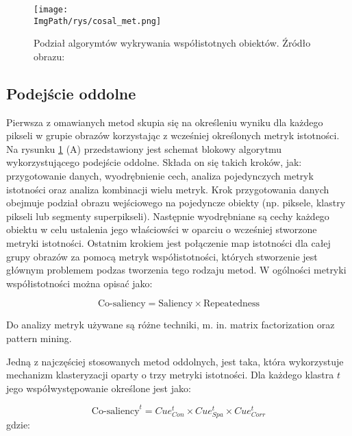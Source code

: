 \documentclass[a4paper,12pt,twoside,openany]{report}
\newcommand{\ImgPath}{.}
\begin{document}
	\begin{figure}[h]
		\centering
		\texttt{[image: \\ImgPath/rys/cosal\_met.png]}
		\caption{Podział algorymtów wykrywania współistotnych obiektów. Źródło obrazu: \cite{10.1145/3158674}}
		\label{pod}
	\end{figure}

	\subsection{Podejście oddolne}
	Pierwsza z omawianych metod skupia się na określeniu wyniku dla każdego pikseli w grupie obrazów korzystając z wcześniej określonych metryk istotności. Na rysunku \ref{pod} (A) przedstawiony jest schemat blokowy algorytmu wykorzystującego podejście oddolne. Składa on się takich kroków, jak: przygotowanie danych, wyodrębnienie cech, analiza pojedynczych metryk istotności oraz analiza kombinacji wielu metryk. Krok przygotowania danych obejmuje podział obrazu wejściowego na pojedyncze obiekty (np. piksele, klastry pikseli lub segmenty superpikseli). Następnie wyodrębniane są cechy każdego obiektu w celu ustalenia jego właściowści w oparciu o wcześniej stworzone metryki istotności. Ostatnim krokiem jest połączenie map istotności dla całej grupy obrazów za pomocą metryk współistotności, których stworzenie jest głównym problemem podzas tworzenia tego rodzaju metod. W ogólności metryki współistotności można opisać jako:

	$$
		\text{Co-saliency} = \text{Saliency} \times \text{Repeatedness}
	$$



	Do analizy metryk używane są różne techniki, m. in. matrix factorization oraz pattern mining. 

	Jedną z najczęściej stosowanych metod oddolnych, jest taka, która wykorzystuje mechanizm klasteryzacji oparty o trzy metryki istotności. Dla każdego klastra $t$ jego współwystępowanie określone jest jako:

	\begin{equation}
		\text{Co-saliency}^t = Cue^t_{Con} \times Cue^t_{Spa} \times Cue^t_{Corr}
	\end{equation}
	gdzie:
\end{document}
